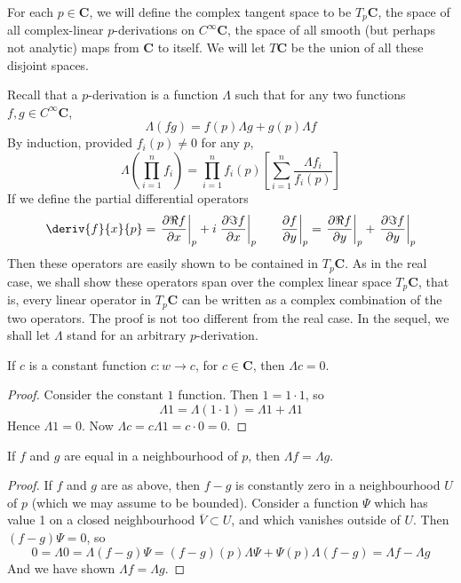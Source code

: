 \begin{definition}
    For each $p \in \mathbf{C}$, we will define the complex tangent space to be $T_p \mathbf{C}$, the space of all complex-linear $p$-derivations on $C^\infty \mathbf{C}$, the space of all smooth (but perhaps not analytic) maps from $\mathbf{C}$ to itself. We will let $T \mathbf{C}$ be the union of all these disjoint spaces.
\end{definition}

Recall that a $p$-derivation is a function $\Lambda$ such that for any two functions $f,g \in C^\infty \mathbf{C}$,
%
\[ \Lambda (fg) = f(p) \Lambda g + g(p) \Lambda f \]
%
By induction, provided $f_i(p) \neq 0$ for any $p$,
%
\[ \Lambda \left(\prod_{i = 1}^n f_i \right) = \prod_{i = 1}^n f_i(p) \left[\sum_{i = 1}^n \frac{\Lambda f_i}{f_i(p)}\right] \]
%
If we define the partial differential operators
%
\[ \deriv{f}{x}{p} = \left.\frac{\partial \Re f}{\partial x}\right|_p + i \left.\frac{\partial \Im f}{\partial x}\right|_p\ \ \ \ \ \left.\frac{\partial f}{\partial y}\right|_p = \left.\frac{\partial \Re f}{\partial y}\right|_p + \left.\frac{\partial \Im f}{\partial y}\right|_p \]
%
Then these operators are easily shown to be contained in $T_p \mathbf{C}$. As in the real case, we shall show these operators span over the complex linear space $T_p \mathbf{C}$, that is, every linear operator in $T_p \mathbf{C}$ can be written as a complex combination of the two operators. The proof is not too different from the real case. In the sequel, we shall let $\Lambda$ stand for an arbitrary $p$-derivation.

\begin{lemma}
    If $c$ is a constant function $c: w \to c$, for $c \in \mathbf{C}$, then $\Lambda c = 0$.
\end{lemma}
\begin{proof}
    Consider the constant $1$ function. Then $1 = 1 \cdotp 1$, so
    \[ \Lambda 1 = \Lambda (1 \cdotp 1) = \Lambda 1 + \Lambda 1 \]
    Hence $\Lambda 1 = 0$. Now $\Lambda c = c \Lambda 1 = c \cdotp 0 = 0$.
\end{proof}

\begin{lemma}
    If $f$ and $g$ are equal in a neighbourhood of $p$, then $\Lambda f = \Lambda g$.
\end{lemma}
\begin{proof}
    If $f$ and $g$ are as above, then $f - g$ is constantly zero in a neighbourhood $U$ of $p$ (which we may assume to be bounded). Consider a function $\Psi$ which has value 1 on a closed neighbourhood $\overline{V} \subset U$, and which vanishes outside of $U$. Then $(f - g) \Psi = 0$, so
    \[ 0 = \Lambda 0 = \Lambda (f - g) \Psi = (f - g)(p) \Lambda \Psi + \Psi(p) \Lambda (f - g) = \Lambda f - \Lambda g \]
    And we have shown $\Lambda f = \Lambda g$.
\end{proof}

